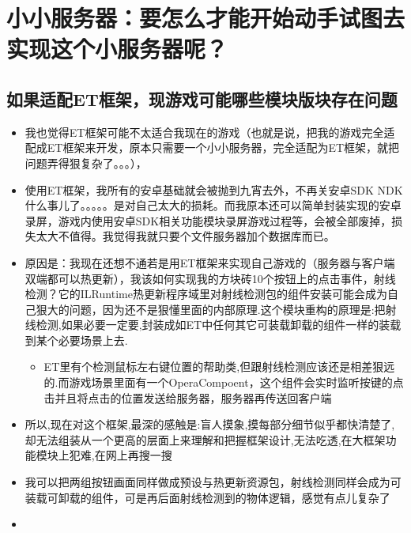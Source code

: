 \documentclass[9pt, b5paper]{article}
\begin{document}
\section{小小服务器：要怎么才能开始动手试图去实现这个小服务器呢？}
\label{sec-2}
\subsection{如果适配ET框架，现游戏可能哪些模块版块存在问题}
\label{sec-2-1}
\begin{itemize}
\item 我也觉得ET框架可能不太适合我现在的游戏（也就是说，把我的游戏完全适配成ET框架来开发，原本只需要一个小小服务器，完全适配为ET框架，就把问题弄得狠复杂了。。。），
\item 使用ET框架，我所有的安卓基础就会被抛到九宵去外，不再关安卓SDK  NDK什么事儿了。。。。。是对自己太大的损耗。而我原本还可以简单封装实现的安卓录屏，游戏内使用安卓SDK相关功能模块录屏游戏过程等，会被全部废掉，损失太大不值得。我觉得我就只要个文件服务器加个数据库而已。
\item 原因是：我现在还想不通若是用ET框架来实现自己游戏的（服务器与客户端双端都可以热更新），我该如何实现我的方块砖10个按钮上的点击事件，射线检测？它的ILRuntime热更新程序域里对射线检测包的组件安装可能会成为自己狠大的问题，因为还不是狠懂里面的内部原理.这个模块重构的原理是:把射线检测,如果必要一定要,封装成如ET中任何其它可装载卸载的组件一样的装载到某个必要场景上去.
\begin{itemize}
\item ET里有个检测鼠标左右键位置的帮助类,但跟射线检测应该还是相差狠远的.而游戏场景里面有一个OperaCompoent，这个组件会实时监听按键的点击并且将点击的位置发送给服务器，服务器再传送回客户端
\end{itemize}
\item 所以,现在对这个框架,最深的感触是:盲人摸象,摸每部分细节似乎都快清楚了,却无法组装从一个更高的层面上来理解和把握框架设计,无法吃透,在大框架功能模块上犯难,在网上再搜一搜
\item 我可以把两组按钮画面同样做成预设与热更新资源包，射线检测同样会成为可装载可卸载的组件，可是再后面射线检测到的物体逻辑，感觉有点儿复杂了
\item 
\end{itemize}
\end{document}
